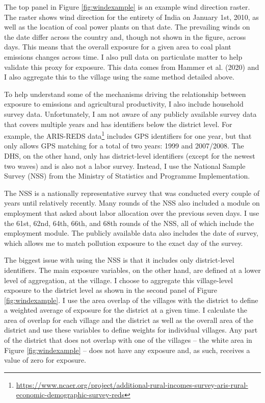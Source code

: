 \documentclass[
]{article}
\begin{document}
The top panel in Figure \ref{fig:windexample} is an example wind direction raster. The raster shows wind direction for the entirety of India on January 1st, 2010, as well as the location of coal power plants on that date. The prevailing winds on the date differ across the country and, though not shown in the figure, across days. This means that the overall exposure for a given area to coal plant emissions changes across time. I also pull data on particulate matter to help validate this proxy for exposure. This data comes from Hammer et al. (2020) and I also aggregate this to the village using the same method detailed above.

To help understand some of the mechanisms driving the relationship between exposure to emissions and agricultural productivity, I also include household survey data. Unfortunately, I am not aware of any publicly available survey data that covers multiple years and has identifiers below the district level. For example, the ARIS-REDS data\footnote{\url{https://www.ncaer.org/project/additional-rural-incomes-survey-aris-rural-economic-demographic-survey-reds}} includes GPS identifiers for one year, but that only allows GPS matching for a total of two years: 1999 and 2007/2008. The DHS, on the other hand, only has district-level identifiers (except for the newest two waves) and is also not a labor survey. Instead, I use the National Sample Survey (NSS) from the Ministry of Statistics and Programme Implementation.

The NSS is a nationally representative survey that was conducted every couple of years until relatively recently. Many rounds of the NSS also included a module on employment that asked about labor allocation over the previous seven days. I use the 61st, 62nd, 64th, 66th, and 68th rounds of the NSS, all of which include the employment module. The publicly available data also includes the date of survey, which allows me to match pollution exposure to the exact day of the survey.

The biggest issue with using the NSS is that it includes only district-level identifiers. The main exposure variables, on the other hand, are defined at a lower level of aggregation, at the village. I choose to aggregate this village-level exposure to the district level as shown in the second panel of Figure \ref{fig:windexample}. I use the area overlap of the villages with the district to define a weighted average of exposure for the district at a given time. I calculate the area of overlap for each village and the district as well as the overall area of the district and use these variables to define weights for individual villages. Any part of the district that does not overlap with one of the villages -- the white area in Figure \ref{fig:windexample} -- does not have any exposure and, as such, receives a value of zero for exposure.
\end{document}
